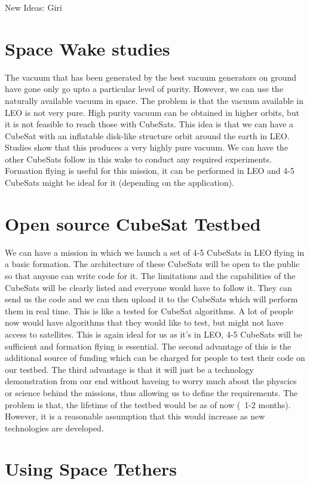 \documentclass[11pt,a4paper]{article}
\begin{document}
\begin{center}
{\Huge New Ideas: Giri}
\end{center}

\section{Space Wake studies}
The vacuum that has been generated by the best vacuum generators on ground have gone only go upto a particular level of purity. However, we can use the naturally available vacuum in space. The problem is that the vacuum available in LEO is not very pure. High purity vacuum can be obtained in higher orbits, but it is not feasible to reach those with CubeSats. This idea is that we can have a CubeSat with an inflatable disk-like structure orbit around the earth in LEO. Studies show that this produces a very highly pure vacuum. We can have the other CubeSats follow in this wake to conduct any required experiments. Formation flying is useful for this mission, it can be performed in LEO and 4-5 CubeSats might be ideal for it (depending on the application).

\section{Open source CubeSat Testbed}

We can have a mission in which we launch a set of 4-5 CubeSats in LEO flying in a basic formation. The architecture of these CubeSats will be open to the public so that anyone can write code for it. The limitations and the capabilities of the CubeSats will be clearly listed and everyone would have to follow it. They can send us the code and we can then upload it to the CubeSats which will perform them in real time. This is like a tested for CubeSat algorithms. A lot of people now would have algorithms that they would like to test, but might not have access to satellites. This is again ideal for us as it's in LEO, 4-5 CubeSats will be sufficient and formation flying is essential. The second advantage of this is the additional source of funding which can be charged for people to test their code on our testbed. The third advantage is that it will just be a technology demonstration from our end without haveing to worry much about the physcics or science behind the missions, thus allowing us to define the requirements. The problem is that, the lifetime of the testbed would be as of now (~1-2 months). However, it is a reasonable assumption that this would increase as new technologies are developed. 

\section{Using Space Tethers}
\end{document}

